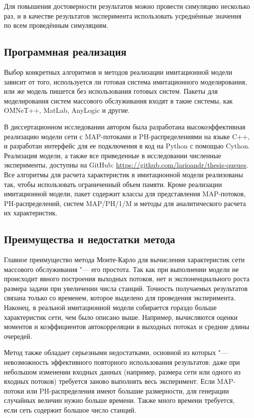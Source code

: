 Для повышения достоверности результатов можно провести симуляцию несколько раз, и в качестве результатов эксперимента использовать усреднённые значения по всем проведённым симуляциям.



\subsection{Программная реализация}

Выбор конкретных алгоритмов и методов реализации имитационной модели зависит от того, используется ли готовая система имитационного моделирования, или же модель пишется без использования готовых систем. Пакеты для моделирования систем массового обслуживания входят в такие системы, как OMNeT++, MatLab, AnyLogic и другие.

В диссертационном исследовании автором была разработана высокоэффективная реализацию модели сети с MAP-потоками и PH-распределениями на языке C++, и разработан интерфейс для ее подключения в код на Python с помощью Cython. Реализация модели, а также все приведенные в исследовании численные эксперименты, доступны на GitHub: \url{https://github.com/larioandr/thesis-queues}. Все алгоритмы для расчета характеристик в имитационной модели реализованы так, чтобы использовать ограниченный объем памяти. Кроме реализации имитационной модели, пакет содержит классы для представления MAP-потоков, PH-распределений, систем MAP/PH/1/M и методы для аналитического расчета их характеристик.


\subsection{Преимущества и недостатки метода}
Главное преимущество метода Монте-Карло для вычисления характеристик сети массового обслуживания "--- его простота. Так как при выполнении модели не происходит явного построения выходных потоков, нет и экспоненциального роста размера задачи при увеличении числа станций. Точность получаемых результатов связана только со временем, которое выделено для проведения эксперимента. Наконец, в реальной имитационной модели собирается гораздо больше характеристик сети, чем было описано выше. Например, вычисляются оценки моментов и коэффициентов автокорреляции в выходных потоках и средние длины очередей.

Метод также обладает серьезными недостатками, основной из которых "--- невозможность эффективного повторного использования результатов: даже при небольшом изменении входных данных (например, размера сети или одного из входных потоков) требуется заново выполнять весь эксперимент. Если MAP-потоки или PH-распределения имеют большие размерности, для генерации случайных величин нужно больше времени. Также много времени требуется, если сеть содержит большое число станций.

